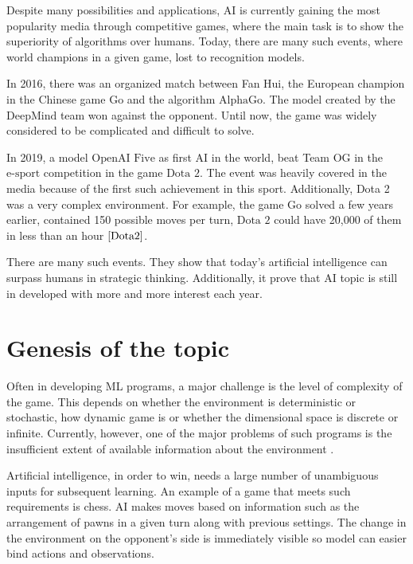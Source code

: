 \documentclass[12pt,oneside,a4paper]{report}
\begin{document}
Despite many possibilities and applications, AI is currently gaining the most 
popularity
media through competitive games, where the main task is to show the superiority of 
algorithms over
humans. Today, there are many such events, where 
world champions in a given game, lost to recognition models. 


In 2016, there was an organized
match between Fan Hui, the European champion in the Chinese game $\text{Go}$ and the algorithm
$\text{AlphaGo}$.
The model created by the $\text{DeepMind}$ team won against the opponent.
Until now, the game was widely considered to be complicated and difficult to solve.

In 2019, a model $\text{OpenAI Five}$ as first AI in the world, beat 
Team OG in the $\text{e-sport}$ competition in the game $\text{Dota 2}$.
The event was heavily covered in the media because of the first such achievement in this
sport. 
Additionally, Dota 2 was a very complex environment.
For example, the game $\text{Go}$ solved a few years earlier, 
contained 150 possible moves per turn, 
$\text{Dota 2}$
could have 20,000 of them in less than an hour $\cite{Dota2}$.



There are many such events. They show that today's 
artificial intelligence can surpass humans in strategic thinking. Additionally, 
it prove that
AI topic is still in developed with more and more interest each year.   


\section{Genesis of the topic}

Often in developing ML programs, a major 
challenge is the level of complexity of the game. 
This depends on whether the environment is deterministic or stochastic, 
how dynamic game is or whether the dimensional space is
discrete or infinite.
Currently, however, one of the major problems of such programs is the insufficient
extent of available information about the environment \cite{CFR}.

Artificial intelligence, in order to win,
needs a large number of unambiguous inputs for subsequent learning.
An example of a game that meets such requirements is chess. 
AI makes moves based on information such as the arrangement of pawns
in a given turn along with previous settings. 
The change in the environment on the opponent's side is immediately visible so
model can easier bind actions and observations. 
\end{document}
